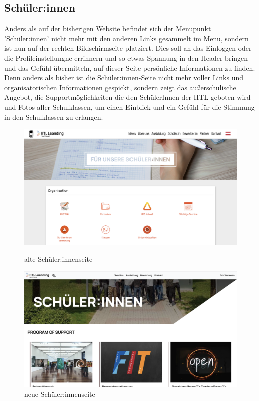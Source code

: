\subsection{Schüler:innen}

Anders als auf der bisherigen Website befindet sich der Menupunkt 'Schüler:innen' nicht mehr mit den anderen Links gesammelt im Menu, sondern 
ist nun auf der rechten Bildschirmseite platziert. Dies soll an das Einloggen oder die Profileinstellungne errinnern und so etwas Spannung in den Header
bringen und das Gefühl übermitteln, auf dieser Seite persönliche Informationen zu finden. Denn anders als bisher ist die Schüler:innen-Seite nicht mehr 
voller Links und organisatorischen Informationen gespickt, sondern zeigt das außerschulische Angebot, die Supportmöglichkeiten die den SchülerInnen
der HTL geboten wird und Fotos aller Schulklassen, um einen Einblick und ein Gefühl für die Stimmung in den Schulklassen zu erlangen.

\begin{figure}
   \begin{minipage}[b]{.4\linewidth} 
      \includegraphics[width=\linewidth]{pics/alt-schüler.png}
      \caption{alte Schüler:innenseite}
      \label{fig:impl:alt:kontakt}
   \end{minipage}
   \hspace{.05\linewidth}
   \begin{minipage}[b]{.4\linewidth}
      \includegraphics[width=\linewidth]{pics/neu-schüler.png}
      \caption{neue Schüler:innenseite}
      \label{fig:impl:neu:kontakt}
   \end{minipage}
\end{figure}


